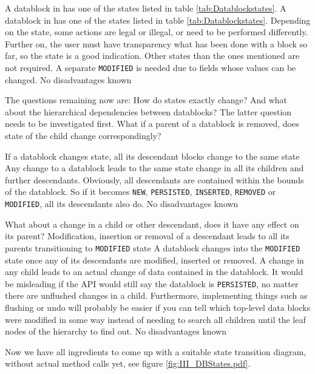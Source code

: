 {%
A datablock in \LibName{} has one of the states listed in table \ref{tab:Datablockstates}.
}
{%
A datablock in \LibName{} has one of the states listed in table \ref{tab:Datablockstates}.
}
{%
Depending on the state, some actions are legal or illegal, or need to be performed differently. Further on, the user must have transparency what has been done with a block so far, so the state is a good indication. Other states than the ones mentioned are not required. A separate \texttt{MODIFIED} is needed due to fields whose values can be changed.
}
{%
No disadvantages known
}

The questions remaining now are: How do states exactly change? And what about the hierarchical dependencies between datablocks? The latter question needs to be investigated first. What if a parent of a datablock is removed, does state of the child change correspondingly?

{%
If a datablock changes state, all its descendant blocks change to the same state
}
{%
Any change to a datablock leads to the same state change in all its children and further descendants.
}
{%
Obviously, all descendants are contained within the bounds of the datablock. So if it becomes \texttt{NEW}, \texttt{PERSISTED}, \texttt{INSERTED}, \texttt{REMOVED} or \texttt{MODIFIED}, all its descendants also do.
}
{%
No disadvantages known
}

What about a change in a child or other descendant, does it have any effect on its parent?
{%
Modification, insertion or removal of a descendant leads to all its parents transitioning to \texttt{MODIFIED} state  
}
{%
A datablock changes into the \texttt{MODIFIED} state once any of its descendants are modified, inserted or removed.
}
{%
A change in any child leads to an actual change of data contained in the datablock. It would be misleading if the API would still say the datablock is \texttt{PERSISTED}, no matter there are unflushed changes in a child. Furthermore, implementing things such as flushing or undo will probably be easier if you can tell which top-level data blocks were modified in some way instead of needing to search all children until the leaf nodes of the hierarchy to find out.
}
{%
No disadvantages known
}

Now we have all ingredients to come up with a suitable state transition diagram, without actual method calls yet, see figure \ref{fig:III_DBStates.pdf}.

